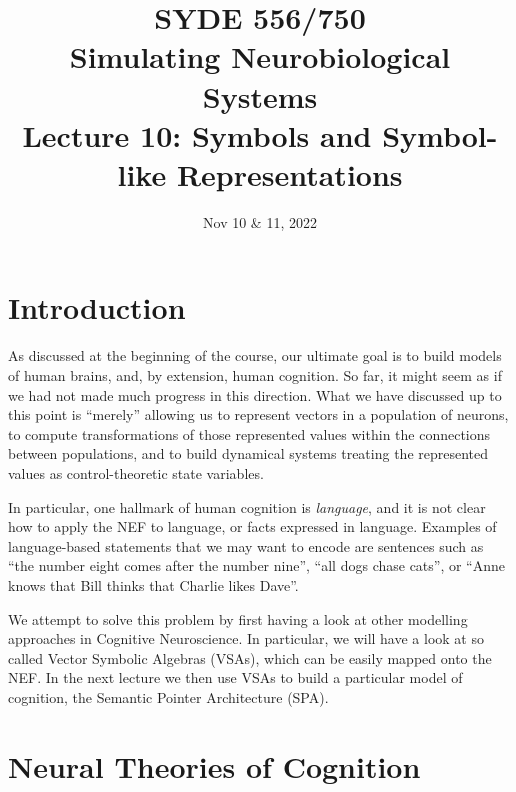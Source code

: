 \documentclass[10pt,letterpaper,oneside]{article}
\date{Nov 10 \& 11, 2022}
\title{SYDE 556/750 \\ Simulating Neurobiological Systems \\ Lecture 10: Symbols and Symbol-like Representations}
\begin{document}

\section{Introduction}


As discussed at the beginning of the course, our ultimate goal is to build models of human brains, and, by extension, human cognition. So far, it might seem as if we had not made much progress in this direction. What we have discussed up to this point is \enquote{merely} allowing us to represent vectors in a population of neurons, to compute transformations of those represented values within the connections between populations, and to build dynamical systems treating the represented values as control-theoretic state variables.

In particular, one hallmark of human cognition is \emph{language}, and it is not clear how to apply the NEF to language, or facts expressed in language. Examples of language-based statements that we may want to encode are sentences such as \enquote{the number eight comes after the number nine}, \enquote{all dogs chase cats}, or \enquote{Anne knows that Bill thinks that Charlie likes Dave}.

We attempt to solve this problem by first having a look at other modelling approaches in Cognitive Neuroscience. In particular, we will have a look at so called Vector Symbolic Algebras (VSAs), which can be easily mapped onto the NEF. In the next lecture we then use VSAs to build a particular model of cognition, the Semantic Pointer Architecture (SPA).

\section{Neural Theories of Cognition}

\end{document}
